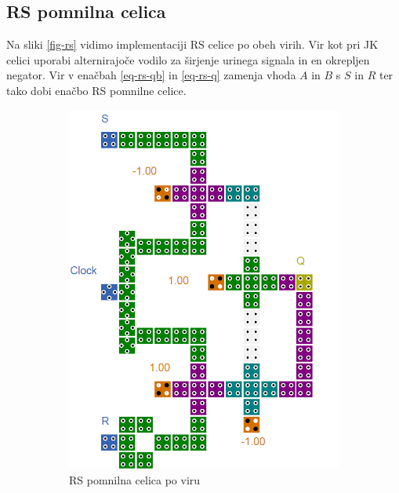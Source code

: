 \documentclass[a4paper, 11pt]{article}
\begin{document}
\subsection{RS pomnilna celica}
Na sliki \ref{fig-rs} vidimo implementaciji RS celice po obeh virih. Vir \cite{quantum_dot} kot pri JK celici uporabi alternirajoče vodilo za širjenje urinega signala in en okrepljen negator. Vir \cite{a_novel_approach} v enačbah \ref{eq-rs-qb} in \ref{eq-rs-q} zamenja vhoda $A$ in $B$ s $S$ in $R$ ter tako dobi enačbo RS pomnilne celice.
\begin{figure}[h!]
	\centering
	\begin{subfigure}[b]{0.4\textwidth}
	\includegraphics[width=\textwidth]{../img/vir_4/sr.png}
	\caption{RS pomnilna celica po viru \cite{quantum_dot}}
	\label{fig-rs-1}
	\end{subfigure}
	\begin{subfigure}[b]{0.4\textwidth}

\end{subfigure}
\end{figure}
\end{document}
